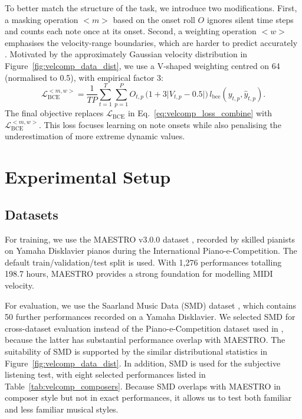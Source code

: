To better match the structure of the task, we introduce two modifications.
First, a masking operation \(<m>\) based on the onset roll \(O\) ignores silent time steps and counts each note once at its onset.
Second, a weighting operation \(<w>\) emphasises the velocity-range boundaries, which are harder to predict accurately \cite{jeong2020note,kim2024method,kim2023score}.
Motivated by the approximately Gaussian velocity distribution in Figure~\ref{fig:velcomp_data_dist}, we use a V-shaped weighting centred on 64 (normalised to 0.5), with empirical factor 3:
\begin{equation}
\mathcal{L}_{\mathrm{BCE}}^{<m,w>} = \frac{1}{TP}\sum_{t=1}^{T}\sum_{p=1}^{P}
O_{t,p}\,\bigl(1 + 3\lvert V_{t,p} - 0.5 \rvert\bigr)\,l_{\mathrm{bce}}\!\left(y_{t,p}, \hat{y}_{t,p}\right).
\label{eq:velcomp_bce_weighted}
\end{equation}
The final objective replaces \(\mathcal{L}_{\mathrm{BCE}}\) in Eq.~\eqref{eq:velcomp_loss_combine} with \(\mathcal{L}_{\mathrm{BCE}}^{<m,w>}\).
This loss focuses learning on note onsets while also penalising the underestimation of more extreme dynamic values.

\section{Experimental Setup}
\label{sec:velcomp:experiment}

\subsection{Datasets}
\label{sec:velcomp:datasets}

For training, we use the MAESTRO v3.0.0 dataset \cite{hawthorne2019maestro}, recorded by skilled pianists on Yamaha Disklavier pianos during the International Piano-e-Competition.
The default train/validation/test split is used.
With 1,276 performances totalling 198.7 hours, MAESTRO provides a strong foundation for modelling MIDI velocity.

For evaluation, we use the Saarland Music Data (SMD) dataset \cite{smd}, which contains 50 further performances recorded on a Yamaha Disklavier.
We selected SMD for cross-dataset evaluation instead of the Piano-e-Competition dataset used in \cite{kuo2021velocity,kim2023piano}, because the latter has substantial performance overlap with MAESTRO.
The suitability of SMD is supported by the similar distributional statistics in Figure~\ref{fig:velcomp_data_dist}.
In addition, SMD is used for the subjective listening test, with eight selected performances listed in Table~\ref{tab:velcomp_composers}.
Because SMD overlaps with MAESTRO in composer style but not in exact performances, it allows us to test both familiar and less familiar musical styles.

